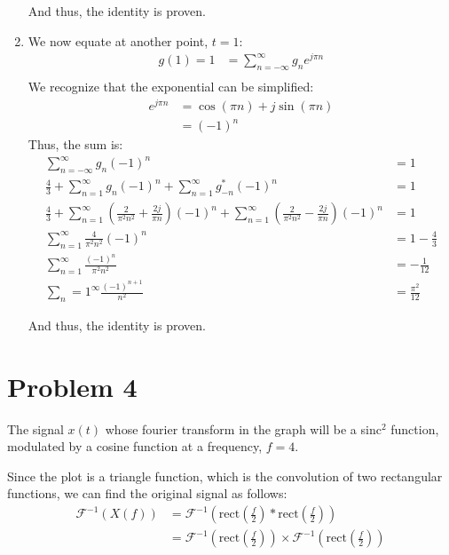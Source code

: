 \documentclass{article}
\begin{document}
\begin{enumerate}[label=3.\arabic*]
    And thus, the identity is proven.

    \item We now equate at another point, $t = 1$:
    \begin{align*}
        g(1) = 1 &= \sum_{n=-\infty}^{\infty} g_n e^{j\pi n} \\
    \end{align*}
    We recognize that the exponential can be simplified:
    \begin{align*}
        e^{j\pi n} &= \cos(\pi n) + j \sin(\pi n) \\
        &= (-1)^n
    \end{align*}
    Thus, the sum is:
    \begin{align*}
        \sum_{n=-\infty}^{\infty} g_n (-1)^n &= 1 \\
        \frac{4}{3} + \sum_{n=1}^{\infty} g_n (-1)^n + \sum_{n=1}^{\infty} g_{-n}^* (-1)^n &= 1 \\
        \frac{4}{3} + \sum_{n=1}^{\infty} \left(\frac{2}{\pi^2 n^2} + \frac{2j}{\pi n}\right) (-1)^n + \sum_{n=1}^{\infty} \left(\frac{2}{\pi^2 n^2} - \frac{2j}{\pi n}\right) (-1)^n &= 1 \\
        \sum_{n=1}^{\infty} \frac{4}{\pi^2 n^2} (-1)^n &= 1 - \frac{4}{3} \\
        \sum_{n=1}^{\infty} \frac{(-1)^n}{\pi^2 n^2} &= -\frac{1}{12} \\
        \sum_n=1^{\infty} \frac{(-1)^{n+1}}{n^2} &= \frac{\pi^2}{12}
    \end{align*}

    And thus, the identity is proven.

\end{enumerate}

\section{Problem 4}
The signal $x(t)$ whose fourier transform in the graph will be a sinc$^2$ function, modulated by a cosine function at a frequency, $f = 4$.

Since the plot is a triangle function, which is the convolution of two rectangular functions, we can find the original signal as follows:
\begin{align*}
    \mathcal{F}^{-1}(X(f)) &= \mathcal{F}^{-1}\left(\text{rect}\left(\frac{f}{2}\right) \ast \text{rect}\left(\frac{f}{2}\right)\right) \\
    &= \mathcal{F}^{-1}\left(\text{rect}\left(\frac{f}{2}\right)\right) \times \mathcal{F}^{-1}\left(\text{rect}\left(\frac{f}{2}\right)\right) \\
\end{align*}
\end{document}
